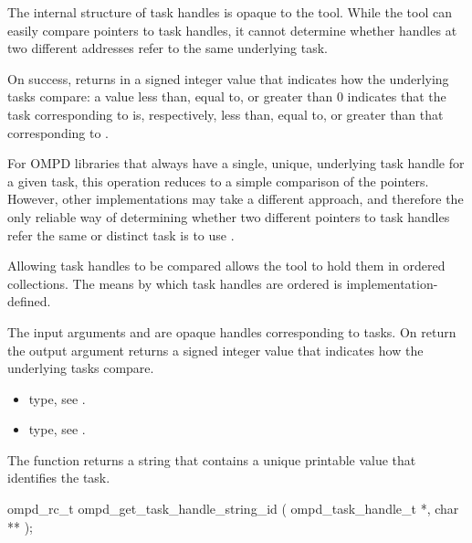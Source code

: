 \descr
The internal structure of task handles is opaque to the tool. While the tool can easily compare
pointers to task handles, it cannot determine whether handles at two different addresses refer
to the same underlying task.

On success,  returns in  a signed integer
value that indicates how the underlying tasks compare: a value less than, equal to, or greater than
0 indicates that the task corresponding to  is, respectively, less than, equal
to, or greater than that corresponding to .

For OMPD libraries that always have a single, unique, underlying task handle for a given
task, this operation reduces to a simple comparison of the pointers. However, other
implementations may take a different approach, and therefore the only reliable way of determining
whether two different pointers to task handles refer the same or distinct task is to use
.

Allowing task handles to be compared allows the tool to hold them in ordered collections.
The means by which task handles are ordered is implementation-defined.

\argdesc
The input arguments  and  are opaque handles
corresponding to tasks.
On return the output argument   returns a signed
integer value that indicates how the underlying tasks compare.

\crossreferences
\begin{itemize}
  \item {} type, see .
	\item {} type, see .
\end{itemize}

\label{subsubsubsec:ompd_get_task_handle_string_id}
\summary
The  function returns a string that contains a unique
printable value that identifies the task.

\format

\begin{cspecific}
\begin{ompSyntax}
ompd_rc_t ompd_get_task_handle_string_id (
  ompd_task_handle_t *,
  char **
);
\end{ompSyntax}
\end{cspecific}


